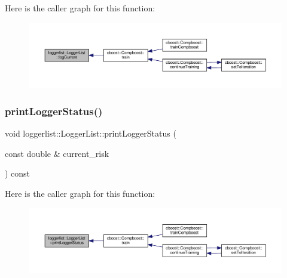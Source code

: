 Here is the caller graph for this function\+:
\nopagebreak
\begin{figure}[H]
\begin{center}
\leavevmode
\includegraphics[width=350pt]{classloggerlist_1_1_logger_list_a5fc042fd489ebd88c09c469763ee9faa_icgraph}
\end{center}
\end{figure}
\mbox{\label{classloggerlist_1_1_logger_list_a107f266cd0e6fe3c4caf743b7ecc3db5}} 
\subsubsection{\texorpdfstring{print\+Logger\+Status()}{printLoggerStatus()}}
{\footnotesize\ttfamily void loggerlist\+::\+Logger\+List\+::print\+Logger\+Status (\begin{DoxyParamCaption}\item[{const double \&}]{current\+\_\+risk }\end{DoxyParamCaption}) const}

Here is the caller graph for this function\+:
\nopagebreak
\begin{figure}[H]
\begin{center}
\leavevmode
\includegraphics[width=350pt]{classloggerlist_1_1_logger_list_a107f266cd0e6fe3c4caf743b7ecc3db5_icgraph}
\end{center}
\end{figure}
\mbox{\label{classloggerlist_1_1_logger_list_a28cd5371bbd9e31f0cf041d6e73d156c}} 
